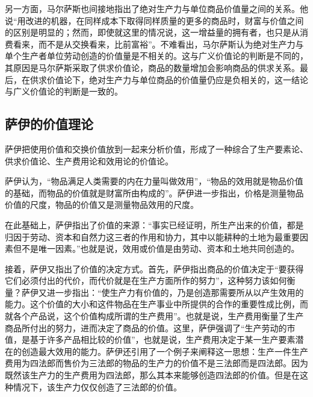 另一方面，马尔萨斯也间接地指出了绝对生产力与单位商品价值量之间的关系。他说“用改进的机器，在同样成本下取得同样质量的更多的商品时，财富与价值之间的区别是明显的；然而，即使就这里的情况说，这一增益量的拥有者，也只是从消费看来，而不是从交换看来，比前富裕”\cite[291]{BiLuo*SiLaFaDaWeiLiJiaTuQuanJiDi2JuanMaErSaSiZhengZhiJingJiXueYuanLiPingZhu2013}。不难看出，马尔萨斯认为绝对生产力与单个生产者单位劳动创造的价值量是不相关的。这与广义价值论的判断是不同的，其原因是马尔萨斯采取了供求价值论，商品的数量增加会影响商品的供求关系。最后，在供求价值论下，绝对生产力与单位商品的价值量仍应是负相关的，这一结论与广义价值论的判断是一致的。

\subsection{萨伊的价值理论}

萨伊把使用价值和交换价值放到一起来分析价值，形成了一种综合了生产要素论、供求价值论、生产费用论和效用论的价值论\cite[138]{YanZhiJieXiFangJingJiXueShuoShiJiaoChengDiErBan2013}。

萨伊认为，“物品满足人类需要的内在力量叫做效用”，“物品的效用就是物品价值的基础，而物品的价值就是财富所由构成的”\cite[59]{SaYiZhengZhiJingJiXueGaiLunCaiFuDeShengChanFenPeiHeXiaoFei2020}。萨伊进一步指出，价格是测量物品价值的尺度，物品的价值又是测量物品效用的尺度\cite[60]{SaYiZhengZhiJingJiXueGaiLunCaiFuDeShengChanFenPeiHeXiaoFei2020}。

在此基础上，萨伊指出了价值的来源：“事实已经证明，所生产出来的价值，都是归因于劳动、资本和自然力这三者的作用和协力，其中以能耕种的土地为最重要因素但不是唯一因素。”\cite[78]{SaYiZhengZhiJingJiXueGaiLunCaiFuDeShengChanFenPeiHeXiaoFei2020}也就是说，效用或价值是由劳动、资本和土地共同创造的。

接着，萨伊又指出了价值的决定方式。首先，萨伊指出商品的价值决定于“要获得它们必须付出的代价，而代价就是在生产方面所作的努力”\cite[351]{SaYiZhengZhiJingJiXueGaiLunCaiFuDeShengChanFenPeiHeXiaoFei2020}，这种努力该如何衡量？萨伊又进一步指出：“使生产力有价值的，乃是创造那需要所从以产生效用的能力。这个价值的大小和这件物品在生产事业中所提供的合作的重要性成比例，而就各个产品说，这个价值构成所谓的生产费用”\cite[352]{SaYiZhengZhiJingJiXueGaiLunCaiFuDeShengChanFenPeiHeXiaoFei2020}。也就是说，生产费用衡量了生产商品所付出的努力，进而决定了商品的价值。这里，萨伊强调了“生产劳动的市值，是基于许多产品相比较的价值”\cite[352]{SaYiZhengZhiJingJiXueGaiLunCaiFuDeShengChanFenPeiHeXiaoFei2020}，也就是说，生产费用决定于某一生产要素潜在的创造最大效用的能力。萨伊还引用了一个例子来阐释这一思想：生产一件生产费用为四法郎而售价为三法郎的物品的生产力的价值不是三法郎而是四法郎。因为既然该生产力的生产费用为四法郎，那么其本来能够创造四法郎的价值。但是在这种情况下，该生产力仅仅创造了三法郎的价值\cite[352]{SaYiZhengZhiJingJiXueGaiLunCaiFuDeShengChanFenPeiHeXiaoFei2020}。

